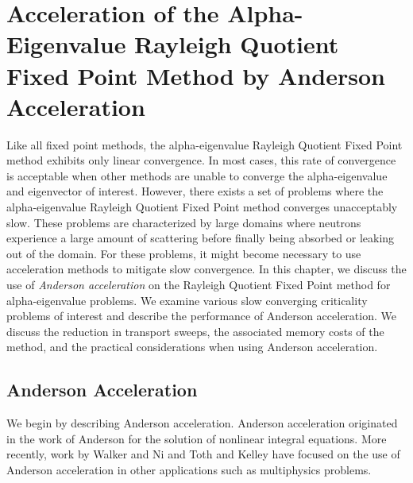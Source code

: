 \chapter[Acceleration of the Alpha-Eigenvalue Rayleigh Quotient Fixed Point Method by Anderson Acceleration][Anderson Acceleration]{Acceleration of the Alpha-Eigenvalue Rayleigh Quotient Fixed Point Method by Anderson Acceleration}
\label{sec:AndAcc}

Like all fixed point methods, the alpha-eigenvalue Rayleigh Quotient Fixed Point method exhibits only linear convergence. In most cases, this rate of convergence is acceptable when other methods are unable to converge the alpha-eigenvalue and eigenvector of interest. However, there exists a set of problems where the alpha-eigenvalue Rayleigh Quotient Fixed Point method converges unacceptably slow. These problems are characterized by large domains where neutrons experience a large amount of scattering before finally being absorbed or leaking out of the domain. For these problems, it might become necessary to use acceleration methods to mitigate slow convergence. In this chapter, we discuss the use of \textit{Anderson acceleration} on the Rayleigh Quotient Fixed Point method for alpha-eigenvalue problems. We examine various slow converging criticality problems of interest and describe the performance of Anderson acceleration. We discuss the reduction in transport sweeps, the associated memory costs of the method, and the practical considerations when using Anderson acceleration.

\section{Anderson Acceleration}

We begin by describing Anderson acceleration. Anderson acceleration originated in the work of Anderson \cite{anderson1965iterative} for the solution of nonlinear integral equations. More recently, work by Walker and Ni \cite{walker_anderson_2011} and Toth and Kelley \cite{toth_convergence_2015} have focused on the use of Anderson acceleration in other applications such as multiphysics problems. 

